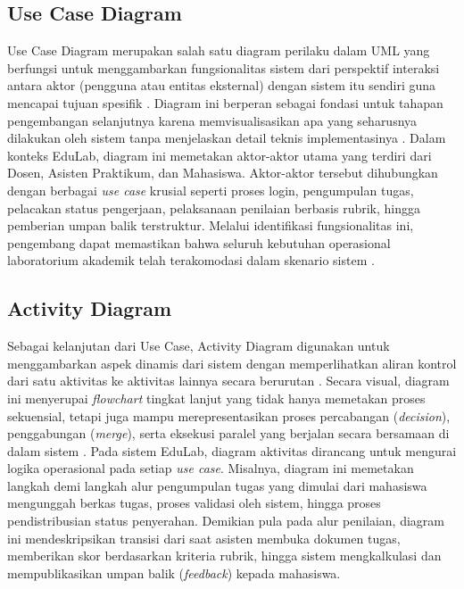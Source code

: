 \documentclass[12pt,a4paper,twoside]{report}
\begin{document}
\subsection{Use Case Diagram}

Use Case Diagram merupakan salah satu diagram perilaku dalam UML yang berfungsi untuk menggambarkan fungsionalitas sistem dari perspektif interaksi antara aktor (pengguna atau entitas eksternal) dengan sistem itu sendiri guna mencapai tujuan spesifik \cite{dennis2015}. Diagram ini berperan sebagai fondasi untuk tahapan pengembangan selanjutnya karena memvisualisasikan apa yang seharusnya dilakukan oleh sistem tanpa menjelaskan detail teknis implementasinya \cite{booch2005}. Dalam konteks EduLab, diagram ini memetakan aktor-aktor utama yang terdiri dari Dosen, Asisten Praktikum, dan Mahasiswa. Aktor-aktor tersebut dihubungkan dengan berbagai \textit{use case} krusial seperti proses login, pengumpulan tugas, pelacakan status pengerjaan, pelaksanaan penilaian berbasis rubrik, hingga pemberian umpan balik terstruktur. Melalui identifikasi fungsionalitas ini, pengembang dapat memastikan bahwa seluruh kebutuhan operasional laboratorium akademik telah terakomodasi dalam skenario sistem \cite{adekunle2024}.

\subsection{Activity Diagram}

Sebagai kelanjutan dari Use Case, Activity Diagram digunakan untuk menggambarkan aspek dinamis dari sistem dengan memperlihatkan aliran kontrol dari satu aktivitas ke aktivitas lainnya secara berurutan \cite{dennis2015}. Secara visual, diagram ini menyerupai \textit{flowchart} tingkat lanjut yang tidak hanya memetakan proses sekuensial, tetapi juga mampu merepresentasikan proses percabangan (\textit{decision}), penggabungan (\textit{merge}), serta eksekusi paralel yang berjalan secara bersamaan di dalam sistem \cite{fowler2004}. Pada sistem EduLab, diagram aktivitas dirancang untuk mengurai logika operasional pada setiap \textit{use case}. Misalnya, diagram ini memetakan langkah demi langkah alur pengumpulan tugas yang dimulai dari mahasiswa mengunggah berkas tugas, proses validasi oleh sistem, hingga proses pendistribusian status penyerahan. Demikian pula pada alur penilaian, diagram ini mendeskripsikan transisi dari saat asisten membuka dokumen tugas, memberikan skor berdasarkan kriteria rubrik, hingga sistem mengkalkulasi dan mempublikasikan umpan balik (\textit{feedback}) kepada mahasiswa.
\end{document}
